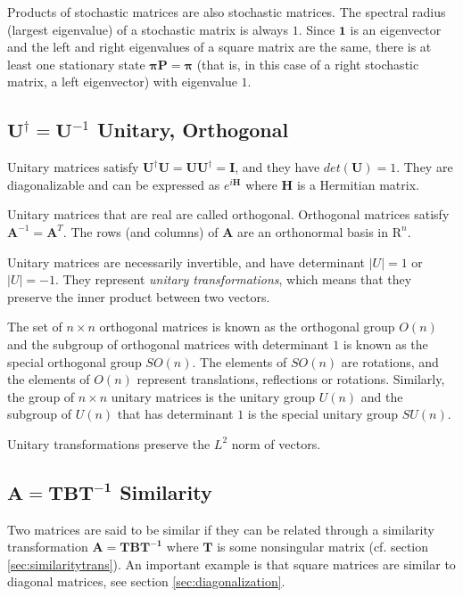 Products of stochastic matrices are also stochastic matrices. The spectral radius (largest eigenvalue) of a stochastic matrix is always $1$. Since $\mathbf{1}$ is an eigenvector and the left and right eigenvalues of a square matrix are the same, there is at least one stationary state $\mathbf{\pi}\mathbf{P}=\mathbf{\pi}$ (that is, in this case of a right stochastic matrix, a left eigenvector) with eigenvalue $1$. 



\subsection{$\mathbf{U}^{\dagger} = \mathbf{U}^{-1}$ Unitary, Orthogonal}
\label{sec:unitary}
Unitary matrices satisfy $\mathbf{U}^{\dagger}\mathbf{U} = \mathbf{UU}^{\dagger}=\mathbf{I}$, and they have $det(\mathbf{U}) = 1$. They are diagonalizable and can be expressed as $e^{i\mathbf{H}}$ where $\mathbf{H}$ is a Hermitian matrix.

Unitary matrices that are real are called orthogonal.  Orthogonal matrices satisfy $\mathbf{A}^{-1} = \mathbf{A}^T$. The rows (and columns) of $\mathbf{A}$ are an orthonormal basis in $\mathrm{R}^n$.

Unitary matrices are necessarily invertible, and have determinant $|U|=1$ or $|U|=-1$. They represent \textit{unitary transformations}, which means that they preserve the inner product between two vectors.

The set of $n \times n$ orthogonal matrices is known as the orthogonal group $O(n)$ and the subgroup of orthogonal matrices with determinant $1$ is known as the special orthogonal group $SO(n)$. The elements of $SO(n)$ are rotations, and the elements of $O(n)$ represent translations, reflections or rotations. Similarly, the group of $n \times n$ unitary matrices is the unitary group $U(n)$ and the subgroup of $U(n)$ that has determinant $1$ is the special unitary group $SU(n)$.

Unitary transformations preserve the $L^2$ norm of vectors.


\subsection{$\mathbf{A} = \mathbf{TBT^{-1}}$ Similarity}
\label{sec:similiarity}
Two matrices are said to be similar if they can be related through a similarity transformation  $\mathbf{A} = \mathbf{TBT^{-1}}$ where $\mathbf{T}$ is some nonsingular matrix (cf. section \ref{sec:similaritytrans}). An important example is that square matrices are similar to diagonal matrices, see section \ref{sec:diagonalization}. 
   

